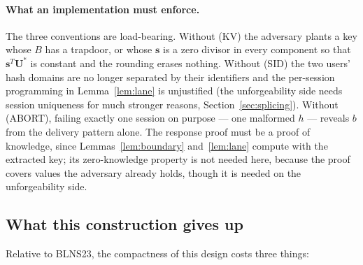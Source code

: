 \documentclass[11pt]{article}
\begin{document}
\paragraph{What an implementation must enforce.}
The three conventions are load-bearing.  Without (KV) the adversary plants
a key whose $B$ has a trapdoor, or whose $\mathbf s$ is a zero divisor in
every component so that $\mathbf s^{T}\mathbf U^*$ is constant and the
rounding erases nothing.  Without (SID) the two users' hash domains are no
longer separated by their identifiers and the per-session programming in
Lemma~\ref{lem:lane} is unjustified (the unforgeability side needs session
uniqueness for much stronger reasons, Section~\ref{sec:splicing}).  Without
(ABORT), failing exactly one session on purpose --- one malformed $h$ ---
reveals $b$ from the delivery pattern alone.  The response proof must be a
proof of knowledge, since Lemmas~\ref{lem:boundary} and~\ref{lem:lane}
compute with the extracted key; its zero-knowledge property is not needed
here, because the proof covers values the adversary already holds, though
it is needed on the unforgeability side.

\subsection{What this construction gives up}
\label{sec:givesup}

Relative to BLNS23, the compactness of this design costs three things:
\end{document}
